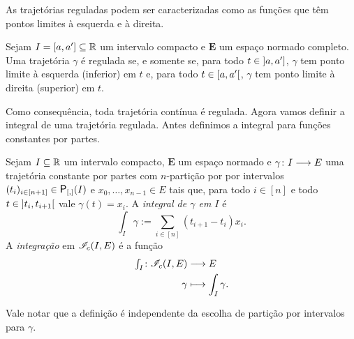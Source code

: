 As trajetórias reguladas podem ser caracterizadas como as funções que têm pontos limites à esquerda e à direita.
\begin{exercise}
Sejam $I = \left[a,\allowbreak a'\right] \subseteq \mathbb{R}$ um intervalo compacto e $\bm E$ um espaço normado completo. Uma trajetória $\gamma$ é regulada se, e somente se, para todo $t \in \left]a,\allowbreak a'\right]$, $\gamma$ tem ponto limite à esquerda (inferior) em $t$ e, para todo $t \in \left[a,\allowbreak a'\right[$, $\gamma$ tem ponto limite à direita (superior) em $t$.
\end{exercise}

Como consequência, toda trajetória contínua é regulada. Agora vamos definir a integral de uma trajetória regulada. Antes definimos a integral para funções constantes por partes.

\begin{definition}
Sejam $I \subseteq \mathbb{R}$ um intervalo compacto, $\bm E$ um espaço normado e $\gamma\colon \allowbreak I \longrightarrow E$ uma trajetória constante por partes com $n$-partição por por intervalos $(t_i)_{i \in [n+1]} \in \Partinter(I)$ e $x_0, \ldots, x_{n-1} \in E$ tais que, para todo $i \in [n]$ e todo $t \in \left]t_i,\allowbreak t_{i+1}\right[$ vale $\gamma(t) = x_i$.
A \emph{integral de $\gamma$ em $I$} é
	\begin{equation*}
	\int_I \gamma := \sum_{i \in [n]} (t_{i+1} - t_i) x_i.
	\end{equation*}
A \emph{integração} em $\mathscr{I}_{c}(I,E)$ é a função
	\begin{align*}
	{\textstyle\int_I}\colon {\mathscr{I}_{c}(I,E)} &\longrightarrow {E} \\{\gamma} &\longmapsto \int_I \gamma.
	\end{align*}
\end{definition}

Vale notar que a definição é independente da escolha de partição por intervalos para $\gamma$.

